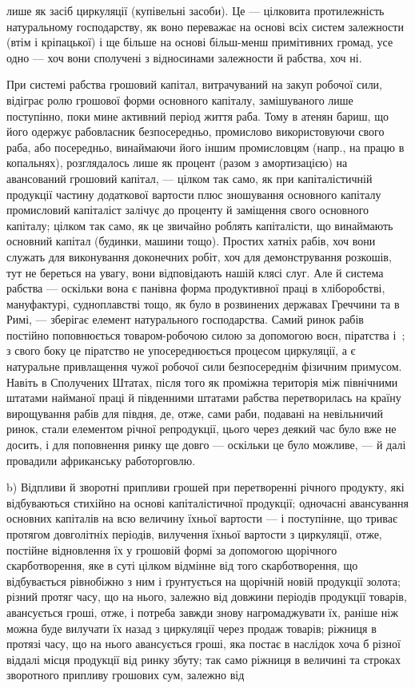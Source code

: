\parcont{}  %
лише як засіб циркуляції (купівельні засоби). Це — цілковита протилежність
натуральному господарству, як воно переважає на основі всіх систем
залежности (втім і кріпацької) і ще більше на основі більш-менш примітивних
громад, усе одно — хоч вони сполучені з відносинами залежности
й рабства, хоч ні.

При системі рабства грошовий капітал, витрачуваний на закуп робочої
сили, відіграє ролю грошової форми основного капіталу, замішуваного
лише поступінно, поки мине активний період життя раба. Тому
в атенян бариш, що його одержує рабовласник безпосередньо, промислово
використовуючи свого раба, або посередньо, винаймаючи його іншим
промисловцям (напр., на працю в копальнях), розглядалось лише як
процент (разом з амортизацією) на авансований грошовий капітал, —
цілком так само, як при капіталістичній продукції частину додаткової
вартости плюс зношування основного капіталу промисловий капіталіст залічує
до проценту й заміщення свого основного капіталу; цілком так само, як
це звичайно роблять капіталісти, що винаймають основний капітал (будинки,
машини тощо). Простих хатніх рабів, хоч вони служать для виконування
доконечних робіт, хоч для демонстрування розкошів, тут не береться на
увагу, вони відповідають нашій клясі слуг. Але й система рабства —
оскільки вона є панівна форма продуктивної праці в хліборобстві, мануфактурі,
судноплавстві тощо, як було в розвинених державах Греччини та
в Римі, — зберігає елемент натурального господарства. Самий ринок
рабів постійно поповнюється товаром-робочою силою за допомогою воєн,
піратства і~; з свого боку це піратство не упосереднюється процесом
циркуляції, а є натуральне привлащення чужої робочої сили
безпосереднім фізичним примусом. Навіть в Сполучених Штатах, після
того як проміжна територія між північними штатами найманої праці й
південними штатами рабства перетворилась на країну вирощування рабів
для півдня, де, отже, сами раби, подавані на невільничий ринок, стали
елементом річної репродукції, цього через деякий час було вже не досить,
і для поповнення ринку ще довго — оскільки це було можливе, — й
далі провадили африканську работорговлю.

b) Відпливи й зворотні припливи грошей при перетворенні річного
продукту, які відбуваються стихійно на основі капіталістичної продукції;
одночасні авансування основних капіталів на всю величину їхньої вартости
— і поступінне, що триває протягом довголітніх періодів, вилучення
їхньої вартости з циркуляції, отже, постійне відновлення їх у грошовій
формі за допомогою щорічного скарботворення, яке в суті цілком
відмінне від того скарботворення, що відбувається рівнобіжно з ним і
ґрунтується на щорічній новій продукції золота; різний протяг часу, що
на нього, залежно від довжини періодів продукції товарів, авансується
гроші, отже, і потреба завжди знову нагромаджувати їх, раніше ніж
можна буде вилучати їх назад з циркуляції через продаж товарів; ріжниця
в протязі часу, що на нього авансується гроші, яка постає в наслідок
хоча б різної віддалі місця продукції від ринку збуту; так само ріжниця
в величині та строках зворотного припливу грошових сум, залежно від
\parbreak{}  %

